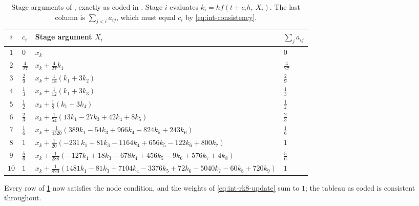 \begin{table}[H]
  \centering
  \caption{Stage arguments of , exactly as coded in
    . Stage $i$ evaluates
    $k_i = h f(t + c_i h,\ X_i)$. The last column is
    $\sum_{j<i} a_{ij}$, which must equal $c_i$ by
    \cref{eq:int-consistency}.}
  \label{tab:int-rk8}
  \setlength{\tabcolsep}{4pt}
  \begin{tabular}{clll}
    \toprule
    $i$ & $c_i$ & Stage argument $X_i$ & $\sum_j a_{ij}$ \\
    \midrule
    $1$  & $0$            & $x_k$ & $0$ \\
    $2$  & $\tfrac{4}{27}$& $x_k + \tfrac{4}{27}k_1$ & $\tfrac{4}{27}$ \\
    $3$  & $\tfrac{2}{9}$ & $x_k + \tfrac{1}{18}\left(k_1 + 3k_2\right)$
         & $\tfrac{2}{9}$ \\
    $4$  & $\tfrac{1}{3}$ & $x_k + \tfrac{1}{12}\left(k_1 + 3k_3\right)$
         & $\tfrac{1}{3}$ \\
    $5$  & $\tfrac{1}{2}$ & $x_k + \tfrac{1}{8}\left(k_1 + 3k_4\right)$
         & $\tfrac{1}{2}$ \\
    $6$  & $\tfrac{2}{3}$
         & $x_k + \tfrac{1}{54}\left(13k_1 - 27k_3 + 42k_4 + 8k_5\right)$
         & $\tfrac{2}{3}$ \\
    $7$  & $\tfrac{1}{6}$
         & $x_k + \tfrac{1}{4320}\left(389k_1 - 54k_3 + 966k_4 - 824k_5
           + 243k_6\right)$
         & $\tfrac{1}{6}$ \\
    $8$  & $1$
         & $x_k + \tfrac{1}{20}\left(-231\,k_1 + 81k_3 - 1164k_4
           + 656k_5 - 122k_6 + 800k_7\right)$
         & $1$ \\
    $9$  & $\tfrac{5}{6}$
         & $x_k + \tfrac{1}{288}\left(-127k_1 + 18k_3 - 678k_4 + 456k_5
           - 9k_6 + 576k_7 + 4k_8\right)$
         & $\tfrac{5}{6}$ \\
    $10$ & $1$
         & $x_k + \tfrac{1}{820}\left(1481k_1 - 81k_3 + 7104k_4 - 3376k_5
           + 72k_6 - 5040k_7 - 60k_8 + 720k_9\right)$
         & $1$ \\
    \bottomrule
  \end{tabular}
\end{table}

Every row of \cref{tab:int-rk8} now satisfies the node condition, and the
weights of \cref{eq:int-rk8-update} sum to $1$; the tableau as coded is
consistent throughout.

